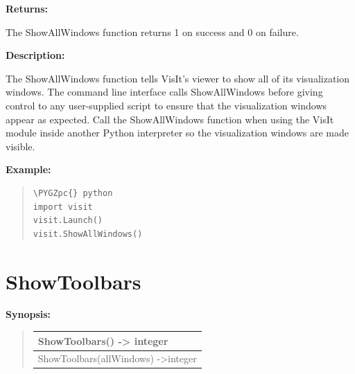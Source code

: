 \documentclass[letterpaper,10pt,english]{sphinxmanual}
\def\PYGZpc{\char`\%}
\begin{document}
\begin{DUlineblock}{0em}
\item[] 
\item[] \textbf{Returns:}
\item[] The ShowAllWindows function returns 1 on success and 0 on failure.
\item[] 
\item[] \textbf{Description:}
\item[] The ShowAllWindows function tells VisIt's viewer to show all of its
visualization windows. The command line interface calls ShowAllWindows
before giving control to any user-supplied script to ensure that the
visualization windows appear as expected. Call the ShowAllWindows function
when using the VisIt module inside another Python interpreter so the
visualization windows are made visible.
\end{DUlineblock}

\begin{DUlineblock}{0em}
\item[] 
\end{DUlineblock}

\begin{DUlineblock}{0em}
\item[] \textbf{Example:}
\item[] 
\end{DUlineblock}
\begin{quote}

\begin{Verbatim}[commandchars=\\\{\}]
\PYGZpc{} python
import visit
visit.Launch()
visit.ShowAllWindows()
\end{Verbatim}
\end{quote}


\section{ShowToolbars}
\label{functions:showtoolbars}
\begin{DUlineblock}{0em}
\item[] \textbf{Synopsis:}
\end{DUlineblock}
\begin{quote}

\begin{tabulary}{\linewidth}{|L|}
\hline

ShowToolbars() -\textgreater{} integer
\\
\hline
ShowToolbars(allWindows) -\textgreater{}integer
\\
\hline\end{tabulary}

\end{quote}
\end{document}
